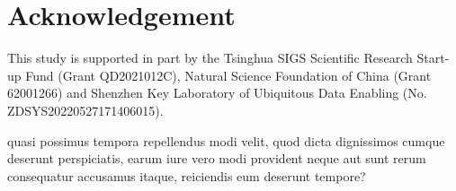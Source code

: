 \documentclass[letterpaper]{article} %
\begin{document}
\section{Acknowledgement}
This study is supported in part by the Tsinghua SIGS Scientific Research Start-up Fund (Grant QD2021012C), Natural Science Foundation of China (Grant 62001266) and Shenzhen Key Laboratory of Ubiquitous Data Enabling (No. ZDSYS20220527171406015).

 quasi possimus tempora repellendus modi velit, quod dicta dignissimos cumque deserunt perspiciatis, earum iure vero modi provident neque aut sunt rerum consequatur accusamus itaque, reiciendis eum deserunt tempore?\clearpage

\end{document}
